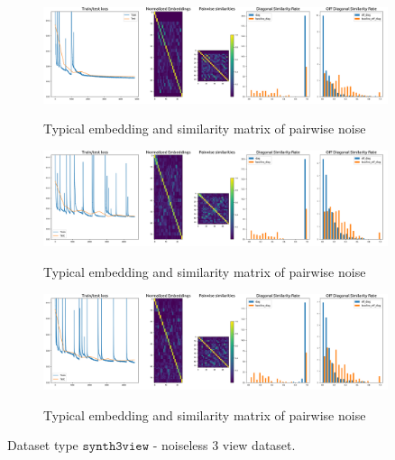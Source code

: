 \documentclass[a4paper]{article}
\begin{document}
\begin{figure}[H]
  \includegraphics[width=0.9\textwidth]{figures/synth-3view-skip-relu-unsup-false-0}
  \label{fig:synth-3view-skip-relu-unsup-false-0-sub1}
  \caption{Typical embedding and similarity matrix of pairwise noise}
\end{figure}
\begin{figure}[H]
  \includegraphics[width=0.9\textwidth]{figures/synth-3view-skip-leakyrelu-unsup-true-0}
  \label{fig:synth-3view-skip-leakyrelu-unsup-true-0-sub1}
  \caption{Typical embedding and similarity matrix of pairwise noise}
\end{figure}
\begin{figure}[H]
  \includegraphics[width=0.9\textwidth]{figures/synth-3view-skip-leakyrelu-unsup-false-0}
  \label{fig:synth-3view-skip-leakyrelu-unsup-false-0-sub1}
  \caption{Typical embedding and similarity matrix of pairwise noise}
\end{figure}
Dataset type $\texttt{synth3view}$ - noiseless 3 view dataset.
\end{document}
